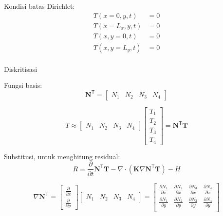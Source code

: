 Kondisi batas Dirichlet:
\begin{align*}
T(x=0,y,t)   & = 0 \\
T(x=L_x,y,t) & = 0 \\
T(x,y=0,t)   & = 0 \\
T(x,y=L_y,t) & = 0 \\
\end{align*}

Diskritisasi

Fungsi basis:
\begin{equation*}
\mathbf{N}^{\mathsf{T}} = \begin{bmatrix}
N_1 & N_2 & N_3 & N_4
\end{bmatrix}
\end{equation*}

\begin{equation*}
T \approx \begin{bmatrix}
N_1 & N_2 & N_3 & N_4
\end{bmatrix}
\begin{bmatrix}
T_1 \\ T_2 \\ T_3 \\ T_4
\end{bmatrix} = 
\mathbf{N}^{\mathsf{T}} \mathbf{T}
\end{equation*}


Substitusi, untuk menghitung residual:
\begin{equation*}
R =
\frac{\partial}{\partial t} \mathbf{N}^{\mathsf{T}} \mathbf{T} -
\nabla \cdot (\mathbf{K} \nabla \mathbf{N}^{\mathsf{T}} \mathbf{T}) - H
\end{equation*}


\begin{equation*}
\nabla \mathbf{N}^{\mathsf{T}} = 
\begin{bmatrix}
\frac{\partial}{\partial x} \\ \frac{\partial}{\partial y}
\end{bmatrix}
\begin{bmatrix}
N_1 & N_2 & N_3 & N_4
\end{bmatrix} = 
\begin{bmatrix}
\frac{\partial N_1}{\partial x} & \frac{\partial N_2}{\partial x} &
\frac{\partial N_3}{\partial x} & \frac{\partial N_4}{\partial x} \\
\frac{\partial N_1}{\partial y} & \frac{\partial N_2}{\partial y} &
\frac{\partial N_3}{\partial y} & \frac{\partial N_4}{\partial y} \\
\end{bmatrix}
\end{equation*}


